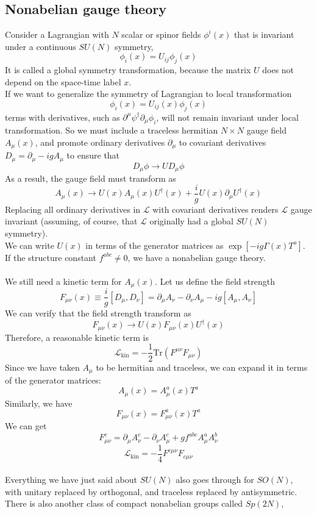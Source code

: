 \documentclass[cyan]{elegantnote}
\begin{document}
\subsection{Nonabelian gauge theory}
Consider a Lagrangian with $N$ scalar or spinor fields $\phi^i(x)$ that is invariant under a continuous $SU(N)$ symmetry,
\[\phi_i(x) = U_{ij}\phi_j(x)\]
It is called a global symmetry transformation, because the matrix $U$ does not depend on the space-time label $x$.
\\
If we want to generalize the symmetry of Lagrangian to local transformation
\[\phi_i(x) = U_{ij}(x)\phi_j(x)\]
terms with derivatives, such as $\partial^{\mu}\psi^{\dagger} \partial_{\mu}\phi_i$, will not remain invariant under local transformation. 
So we must include a traceless hermitian $N \times N$ gauge field $A_{\mu}(x)$, and promote ordinary derivatives $\partial_{\mu}$ to covariant derivatives $D_{\mu} = \partial_{\mu} - igA_{\mu}$ to ensure that
\[D_{\mu}\phi \to UD_{\mu}\phi\]
As a result, the gauge field must transform as
\[A_{\mu}(x) \to U(x)A_{\mu}(x)U^{\dagger}(x) + \frac{i}{g}U(x)\partial_{\mu}U^{\dagger}(x)\]
Replacing all ordinary derivatives in $\mathcal{L}$ with covariant derivatives renders $\mathcal{L}$ gauge invariant (assuming, of course, that $\mathcal{L}$ originally had a global $SU(N)$ symmetry).\\
We can write $U(x)$ in terms of the generator matrices as
$\exp[-ig\Gamma(x)T^a]$. If the structure constant $f^{abc} \neq 0$, we have a nonabelian gauge theory.
\\ \\
We still need a kinetic term for $A_{\mu}(x)$. Let us define the field strength
\[F_{\mu\nu}(x) \equiv \frac{i}{g}[D_{\mu},D_{\nu}] = \partial_{\mu}A_{\nu} - \partial_{\nu}A_{\mu} - ig[A_{\mu},A_{\nu}]\]
We can verify that the field strength transform as
\[F_{\mu\nu}(x) \to U(x)F_{\mu\nu}(x)U^{\dagger}(x)\]
Therefore, a reasonable kinetic term is
\[\mathcal{L}_{\mathrm{kin}} = - \frac{1}{2} \mathrm{Tr}(F^{\mu\nu}F_{\mu\nu})\]
Since we have taken $A_{\mu}$ to be hermitian and traceless, we can expand it in terms of the generator matrices:
\[A_{\mu}(x) = A^a_{\mu}(x)T^a\]
Similarly, we have
\[F_{\mu\nu}(x) = F^a_{\mu\nu}(x)T^a \]
We can get
\[F^{c}_{\mu\nu} = \partial_{\mu}A^c_{\nu} - \partial_{\nu}A^c_{\mu} + gf^{abc}A^a_{\mu}A^b_{\nu}\]
\[\mathcal{L}_{\mathrm{kin}} = -\frac{1}{4}F^{c\mu\nu}F_{c\mu\nu}\]
\\
Everything we have just said about $SU(N)$ also goes through for $SO(N)$, with unitary replaced by orthogonal, and traceless replaced by antisymmetric. There is also another class of compact nonabelian groups called $Sp(2N)$,
\end{document}
